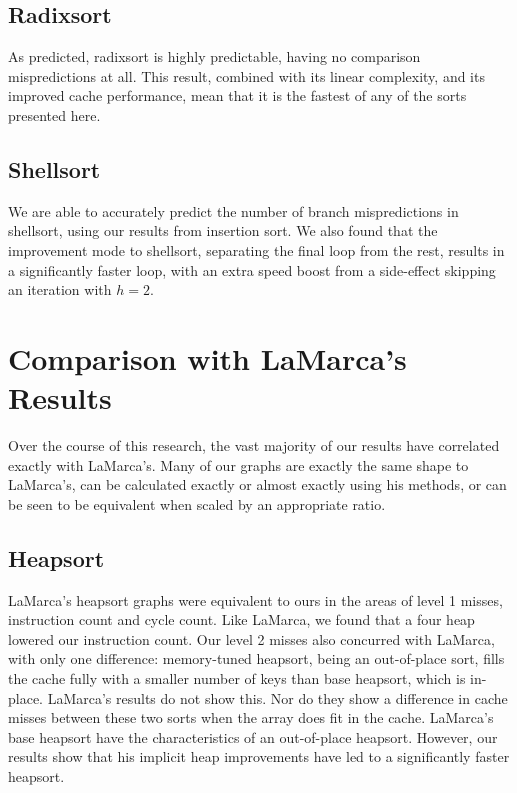 \subsection{Radixsort}

As predicted, radixsort is highly predictable, having no comparison
mispredictions at all. This result, combined with its linear complexity, and its
improved cache performance, mean that it is the fastest of any of the sorts
presented here.


\subsection{Shellsort}

We are able to accurately predict the number of branch mispredictions in
shellsort, using our results from insertion sort. We also found that the
improvement mode to shellsort, separating the final loop from the rest, results
in a significantly faster loop, with an extra speed boost from a side-effect
skipping an iteration with $h = 2$.


\section{Comparison with LaMarca's Results}


Over the course of this research, the vast majority of our results have
correlated exactly with LaMarca's. Many of our graphs are exactly the same
shape to LaMarca's, can be calculated exactly or almost exactly using his
methods, or can be seen to be equivalent when scaled by an appropriate ratio.


\subsection{Heapsort}

LaMarca's heapsort graphs were equivalent to ours in the areas of level 1
misses, instruction count and cycle count. Like LaMarca, we found that a four
heap lowered our instruction count. Our level 2 misses also concurred with
LaMarca, with only one difference: memory-tuned heapsort, being an out-of-place sort,
fills the cache fully with a smaller number of keys than base heapsort, which is
in-place. LaMarca's results do not show this. Nor do they show a difference in
cache misses between these two sorts when the array does fit in the cache.
LaMarca's base heapsort have the characteristics of an out-of-place heapsort.
However, our results show that his implicit heap improvements have led to a
significantly faster heapsort.


